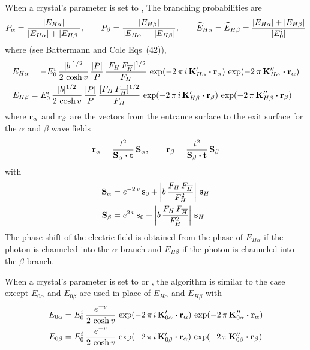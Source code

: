 When a crystal's  parameter is set to , The branching
probabilities are
\begin{equation}
  P_\alpha = \frac{|E_{H\alpha}|}{|E_{H\alpha}| + |E_{H\beta}|} , \qquad
  P_\beta = \frac{|E_{H\beta}|}{|E_{H\alpha}| + |E_{H\beta}|} , \qquad
  \widehat E_{H\alpha} = \widehat E_{H\beta}  = \frac{|E_{H\alpha}| + |E_{H\beta}|}{|E_0^i|}
\end{equation}
where (see Battermann and Cole\cite{b:batterman} Eqs~(42)), 
\begin{align}
  E_{H\alpha} &= -E_0^i \, \frac{\displaystyle |b|^{1/2}}{\displaystyle 2 \, \cosh v} \, 
    \frac{|P|}{P} \, 
    \frac{[F_H \, F_{\overline{H}}]^{1/2}}{F_H} \, 
    \exp({-2 \, \pi \, i \, {\bf K}'_{H\alpha} \mathbin{\boldsymbol{\cdot}} {\bf r}_\alpha}) \,
    \exp({-2 \, \pi \, {\bf K}''_{H\alpha} \mathbin{\boldsymbol{\cdot}} {\bf r}_\alpha}) \nonumber \\
  E_{H\beta} &= E_0^i \, \frac{\displaystyle |b|^{1/2}}{\displaystyle 2 \, \cosh v} \, 
    \frac{|P|}{P} \, 
    \frac{[F_H \, F_{\overline{H}}]^{1/2}}{F_H} \, 
    \exp({-2 \, \pi \, i \, {\bf K}'_{H\beta} \mathbin{\boldsymbol{\cdot}} {\bf r}_\beta}) \,
    \exp({-2 \, \pi \, {\bf K}''_{H\beta} \mathbin{\boldsymbol{\cdot}} {\bf r}_\beta})
\end{align}
where ${\bf r}_\alpha$ and ${\bf r}_\beta$ are the vectors from the entrance surface to the exit surface
for the $\alpha$ and $\beta$ wave fields
\begin{equation}
  {\bf r}_\alpha = \frac{t^2}{{\bf S}_\alpha \mathbin{\boldsymbol{\cdot}} {\bf t}} \, {\bf S}_\alpha , \qquad
  {\bf r}_\beta = \frac{t^2}{{\bf S}_\beta \mathbin{\boldsymbol{\cdot}} {\bf t}} \, {\bf S}_\beta
\end{equation}
with
\begin{align}
  {\bf S}_\alpha &= e^{-2 \, v} \, {\bf s}_0 + \left| b \, \frac{F_H \, F_{\overline{H}}}{F_H^2} \right| \, {\bf s}_H \nonumber \\
  {\bf S}_\beta &= e^{2 \, v} \, {\bf s}_0 + \left| b \, \frac{F_H \, F_{\overline{H}}}{F_H^2} \right| \, {\bf s}_H 
\end{align}
The phase shift of the electric field is obtained from the phase of $E_{H\alpha}$ if the photon is
channeled into the $\alpha$ branch and $E_{H\beta}$ if the photon is channeled into the $\beta$
branch.

When a crystal's  parameter is set to  or
, the algorithm is similar to the  case except $E_{0\alpha}$
and $E_{0\beta}$ are used in place of $E_{H\alpha}$ and $E_{H\beta}$ with
\begin{align}
  E_{0\alpha} &= E_0^i \, \frac{\displaystyle e^{-v}}{\displaystyle 2 \, \cosh v} \, 
    \exp({-2 \, \pi \, i \, {\bf K}'_{0\alpha} \mathbin{\boldsymbol{\cdot}} {\bf r}_\alpha}) \,
    \exp({-2 \, \pi \, {\bf K}''_{0\alpha} \mathbin{\boldsymbol{\cdot}} {\bf r}_\alpha}) \nonumber \\
  E_{0\beta} &= E_0^i \, \frac{\displaystyle e^{-v}}{\displaystyle 2 \, \cosh v} \, 
    \exp({-2 \, \pi \, i \, {\bf K}'_{0\beta} \mathbin{\boldsymbol{\cdot}} {\bf r}_\alpha}) \,
    \exp({-2 \, \pi \, {\bf K}''_{0\beta} \mathbin{\boldsymbol{\cdot}} {\bf r}_\beta})
\end{align}

